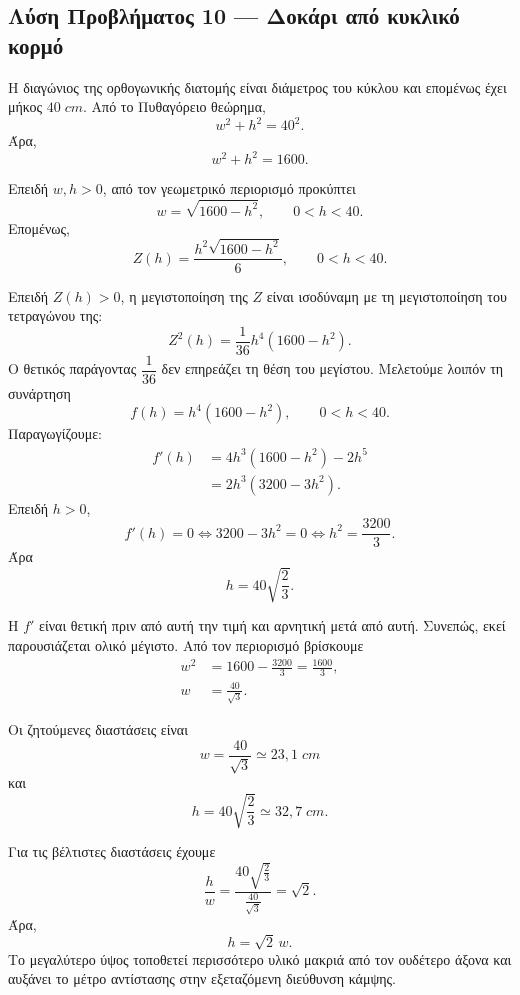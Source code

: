 \subsection*{Λύση Προβλήματος 10 --- Δοκάρι από κυκλικό κορμό}

\begin{alist}
  \item Η διαγώνιος της ορθογωνικής διατομής είναι διάμετρος του
        κύκλου και επομένως έχει μήκος $40\;\si{cm}$. Από το
        Πυθαγόρειο θεώρημα,
        \[
          w^2+h^2=40^2.
        \]
        Άρα,
        \[
          {w^2+h^2=1600}.
        \]

  \item Επειδή $w,h>0$, από τον γεωμετρικό περιορισμό προκύπτει
        \[
          w=\sqrt{1600-h^2},
          \qquad 0<h<40.
        \]
        Επομένως,
        \[
          Z(h)=\frac{h^2\sqrt{1600-h^2}}{6},
          \qquad 0<h<40.
        \]

  \item Επειδή $Z(h)>0$, η μεγιστοποίηση της $Z$ είναι ισοδύναμη με
        τη μεγιστοποίηση του τετραγώνου της:
        \[
          Z^2(h)=\frac{1}{36}h^4(1600-h^2).
        \]
        Ο θετικός παράγοντας $\dfrac1{36}$ δεν επηρεάζει τη θέση του
        μεγίστου. Μελετούμε λοιπόν τη συνάρτηση
        \[
          f(h)=h^4(1600-h^2),
          \qquad 0<h<40.
        \]
        Παραγωγίζουμε:
        \begin{align*}
          f'(h)
          &=4h^3(1600-h^2)-2h^5\\
          &=2h^3(3200-3h^2).
        \end{align*}
        Επειδή $h>0$,
        \[
          f'(h)=0
          \Longleftrightarrow
          3200-3h^2=0
          \Longleftrightarrow
          h^2=\frac{3200}{3}.
        \]
        Άρα
        \[
          h=40\sqrt{\frac23}.
        \]

        Η $f'$ είναι θετική πριν από αυτή την τιμή και αρνητική μετά
        από αυτή. Συνεπώς, εκεί παρουσιάζεται ολικό μέγιστο. Από τον
        περιορισμό βρίσκουμε
        \begin{align*}
          w^2
          &=1600-\frac{3200}{3}
            =\frac{1600}{3},\\
          w&=\frac{40}{\sqrt3}.
        \end{align*}

        Οι ζητούμενες διαστάσεις είναι
        \[
          {
          w=\frac{40}{\sqrt3}\simeq23{,}1\;\si{cm}}
        \]
        και
        \[
          {
          h=40\sqrt{\frac23}\simeq32{,}7\;\si{cm}}.
        \]

  \item Για τις βέλτιστες διαστάσεις έχουμε
        \[
          \frac{h}{w}
          =
          \frac{40\sqrt{\frac23}}{\frac{40}{\sqrt3}}
          =\sqrt2.
        \]
        Άρα,
        \[
          {h=\sqrt2\,w}.
        \]
        Το μεγαλύτερο ύψος τοποθετεί περισσότερο υλικό μακριά από τον
        ουδέτερο άξονα και αυξάνει το μέτρο αντίστασης στην εξεταζόμενη
        διεύθυνση κάμψης.
\end{alist}
